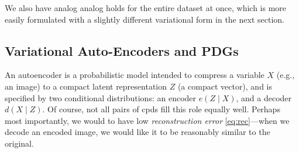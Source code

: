 \documentclass{article}
\makeatletter
\theoremstyle{plain}
\theoremstyle{definition}
\let\H\relax
\DeclareMathOperator{\H}{\mathrm{H}} %
\DeclareMathOperator*{\Ex}{\mathbb{E}} %
\newcommand{\datadist}[1]{\Pr\nolimits_{#1}}
\newcommand\Inc{\mathit{Inc}}
\newcommand\aar{\@ifstar\aar@one@star\aar@plain}
\newcommand\aar@one@star{\@ifstar\aar@resize{\aar@plain*}}
\newcommand\aar@resize[1]{\sbox{\aar@content}{#1}\scaleleftright[3.8ex]
		{\Biggl\langle\!\!\!\!\Biggl\langle}{\usebox{\aar@content}}
		{\Biggr\rangle\!\!\!\!\Biggr\rangle}}
\makeatother
\begin{document}
 We also have analog analog holds for the entire dataset at once, which is more easily formulated with a slightly different variational form in the next section.



\subsection{Variational Auto-Encoders and PDGs}

An autoencoder is a probabilistic model intended to compress a variable $X$ (e.g., an image) to a compact latent representation $Z$ (a compact vector), and is specified by two conditional distributions:
an encoder $e(Z \mid X)$, and a decoder $d(X \mid Z)$.
Of course, not all pairs of cpds fill this role equally well.
Perhaps most importantly, we would to have low \emph{reconstruction error} \eqref{eq:rec}---when we decode an encoded image, we would like it to be reasonably similar to the original.
\end{document}
